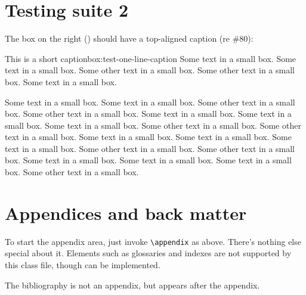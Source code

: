 \documentclass{grattan}
\begin{document}
\chapter{Testing suite 2}\label{chap:test-2}
The box on the right () should have a top-aligned caption (re \#80):

\begin{smallbox}{This is a short caption}{box:test-one-line-caption}
Some text in a small box. 
Some text in a small box. 
Some other text in a small box. 
Some other text in a small box. 
Some text in a small box. 

Some text in a small box. 
Some text in a small box. 
Some other text in a small box. 
Some other text in a small box. 
Some text in a small box. 
Some text in a small box. 
Some text in a small box. 
Some other text in a small box. 
Some other text in a small box. 
Some text in a small box. 
Some text in a small box. 
Some text in a small box. 
Some other text in a small box. 
Some other text in a small box. 
Some text in a small box. 
Some text in a small box. 
Some text in a small box. 
Some other text in a small box.  
\end{smallbox}
\appendix

\chapter{Appendices and back matter}\label{chap:appendices}
To start the appendix area, just invoke \verb=\appendix= as above. 
There's nothing else special about it.
Elements such as glossaries and indexes are not supported by this class file, though can be implemented.

The bibliography is not an appendix, but appears after the appendix. 


\printbibliography
\end{document}
